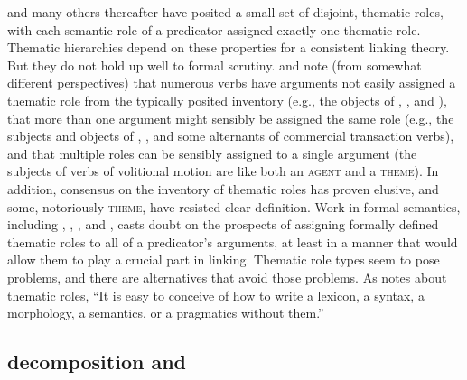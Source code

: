 \documentclass[output=paper
                ,modfonts
                ,nonflat
	        ,collection
	        ,collectionchapter
	        ,collectiontoclongg
 	        ,biblatex
                ,babelshorthands
                ,newtxmath
                ,draftmode
                ,colorlinks, citecolor=brown
]{./langsci/langscibook}
\begin{document}
\citet{Fillmore1968} and many others thereafter have posited a small set of disjoint, thematic roles, with each semantic role of a predicator assigned exactly one thematic role.
Thematic hierarchies depend on these properties for a consistent linking theory.
But they do not hold up well to formal scrutiny.
\citet{Jackendoff1987} and \citet{Dowty1991} note (from somewhat different perspectives) that numerous verbs have arguments not easily assigned a thematic role from the typically posited inventory (e.g., the objects of , , and ), that more than one argument might sensibly be assigned the same role (e.g., the subjects and objects of , , and some alternants of commercial transaction verbs), and that multiple roles can be sensibly assigned to a single argument (the subjects of verbs of volitional motion are like both an \textsc{agent} and a \textsc{theme}).
In addition, consensus on the inventory of thematic roles has proven elusive, and some, notoriously \textsc{theme}, have resisted clear definition.
Work in formal semantics, including \citet{LadusawandDowty1988}, \citet{Dowty1989}, \citet{Landman2000}, and \cite{Schein2002}, casts doubt on the prospects of assigning formally defined thematic roles to all of a predicator's arguments, at least in a manner that would allow them to play a crucial part in linking.
Thematic role types seem to pose problems, and there are alternatives that avoid those problems.  As \citet{Carlson1998} notes about thematic roles, ``It is easy to conceive of how to write a lexicon, a syntax, a morphology, a semantics, or a pragmatics without them.''

%


\subsection{\content decomposition and \argst}
%
%
%
\end{document}
